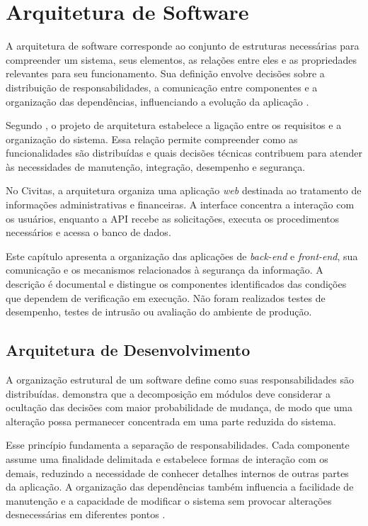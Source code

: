 \chapter{Arquitetura de Software}
\label{cap:arquitetura-software}

A arquitetura de software corresponde ao conjunto de estruturas necessárias para compreender um sistema, seus elementos, as relações entre eles e as propriedades relevantes para seu funcionamento. Sua definição envolve decisões sobre a distribuição de responsabilidades, a comunicação entre componentes e a organização das dependências, influenciando a evolução da aplicação \parencite{Bass2021SAP}.

Segundo \textcite{Sommerville2018ES10}, o projeto de arquitetura estabelece a ligação entre os requisitos e a organização do sistema. Essa relação permite compreender como as funcionalidades são distribuídas e quais decisões técnicas contribuem para atender às necessidades de manutenção, integração, desempenho e segurança.

No Civitas, a arquitetura organiza uma aplicação \textit{web} destinada ao tratamento de informações administrativas e financeiras. A interface concentra a interação com os usuários, enquanto a API recebe as solicitações, executa os procedimentos necessários e acessa o banco de dados.

Este capítulo apresenta a organização das aplicações de \textit{back-end} e \textit{front-end}, sua comunicação e os mecanismos relacionados à segurança da informação. A descrição é documental e distingue os componentes identificados das condições que dependem de verificação em execução. Não foram realizados testes de desempenho, testes de intrusão ou avaliação do ambiente de produção.

\section{Arquitetura de Desenvolvimento}
\label{sec:cap6-arquitetura-desenvolvimento}

A organização estrutural de um software define como suas responsabilidades são distribuídas. \textcite{Parnas1972} demonstra que a decomposição em módulos deve considerar a ocultação das decisões com maior probabilidade de mudança, de modo que uma alteração possa permanecer concentrada em uma parte reduzida do sistema.

Esse princípio fundamenta a separação de responsabilidades. Cada componente assume uma finalidade delimitada e estabelece formas de interação com os demais, reduzindo a necessidade de conhecer detalhes internos de outras partes da aplicação. A organização das dependências também influencia a facilidade de manutenção e a capacidade de modificar o sistema sem provocar alterações desnecessárias em diferentes pontos \parencite{Martin2019ArquiteturaLimpa}.

